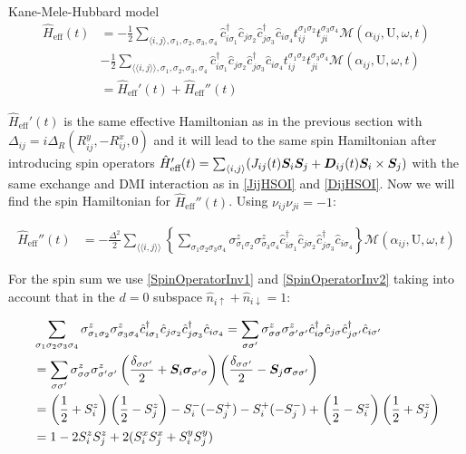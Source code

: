 \begin{section}{Kane-Mele-Hubbard model}
\begin{align*}
\hat{H}_{\text{eff}}(t) &= - \frac{1}{2} \sum_{\langle i,j \rangle, \sigma_1, \sigma_2, \sigma_3, \sigma_4}\hat{c}_{i \sigma_1}^\dagger \hat{c}_{j \sigma_2} \hat{c}_{j \sigma_3}^\dagger \hat{c}_{i \sigma_4} t_{ij}^{\sigma_1 \sigma_2} t_{ji}^{\sigma_3 \sigma_4} \mathcal{M}(\alpha_{ij}, \text{U}, \omega, t) \\
& - \frac{1}{2} \sum_{\langle \langle i,j \rangle \rangle, \sigma_1, \sigma_2, \sigma_3, \sigma_4}\hat{c}_{i \sigma_1}^\dagger \hat{c}_{j \sigma_2} \hat{c}_{j \sigma_3}^\dagger \hat{c}_{i \sigma_4} t_{ij}^{\sigma_1 \sigma_2} t_{ji}^{\sigma_3 \sigma_4} \mathcal{M}(\alpha_{ij}, \text{U}, \omega, t) \\
&= \hat{H}_{\text{eff}}'(t) + \hat{H}_{\text{eff}}''(t)
\end{align*}

$\hat{H}_{\text{eff}}'(t)$ is the same effective Hamiltonian as in the previous section with $\Delta_{ij} = i\Delta_R (R_{ij}^y, - R_{ij}^x, 0)$ and it will lead to the same spin Hamiltonian after introducing spin operators $\hat{H}_{\text{eff}}'(t) = \sum_{\langle i,j \rangle} (J_{ij}(t) \boldsymbol{S}_i\boldsymbol{S}_j + \boldsymbol{D}_{ij}(t)\boldsymbol{S}_i \times \boldsymbol{S}_j)$ with the same exchange and DMI interaction as in \ref{JijHSOI} and \ref{DijHSOI}. Now we will find the spin Hamiltonian for $\hat{H}_{\text{eff}}''(t)$. Using $\nu_{ij}\nu_{ji} = -1$:

\begin{align*}
\hat{H}_{\text{eff}}''(t) &= -\frac{\Delta^2}{2} \sum_{\langle \langle i,j \rangle \rangle} \left\{ \sum_{\sigma_1 \sigma_2 \sigma_3 \sigma_4} \sigma_{\sigma_1 \sigma_2}^z\sigma_{\sigma_3 \sigma_4}^z \hat{c}_{i\sigma_1}^\dagger\hat{c}_{j\sigma_2}\hat{c}_{j\sigma_3}^\dagger\hat{c}_{i\sigma_4} \right\} \mathcal{M}(\alpha_{ij}, \text{U}, \omega, t)
\end{align*}

For the spin sum we use \ref{SpinOperatorInv1} and \ref{SpinOperatorInv2} taking into account that in the $d=0$ subspace $\hat{n}_{i\uparrow}+\hat{n}_{i\downarrow} = 1$:

\begin{align*}
&\sum_{\sigma_1 \sigma_2 \sigma_3 \sigma_4} \sigma_{\sigma_1 \sigma_2}^z\sigma_{\sigma_3 \sigma_4}^z \hat{c}_{i\sigma_1}^\dagger\hat{c}_{j\sigma_2}\hat{c}_{j\sigma_3}^\dagger\hat{c}_{i\sigma_4} = \sum_{\sigma \sigma'} \sigma_{\sigma \sigma}^z\sigma_{\sigma' \sigma'}^z \hat{c}_{i\sigma}^\dagger\hat{c}_{j\sigma}\hat{c}_{j\sigma'}^\dagger\hat{c}_{i\sigma'} \\
&= \sum_{\sigma \sigma'} \sigma_{\sigma \sigma}^z\sigma_{\sigma' \sigma'}^z \left( \frac{\delta_{\sigma\sigma'}}{2} + \boldsymbol{S}_i\boldsymbol{\sigma}_{\sigma'\sigma}\right)\left( \frac{\delta_{\sigma\sigma'}}{2} - \boldsymbol{S}_j\boldsymbol{\sigma}_{\sigma\sigma'}\right) \\
&= \left( \frac{1}{2}+S_i^z \right) \left( \frac{1}{2}-S_j^z \right) - S_i^-(-S_j^+)-S_i^+(-S_j^-) + \left( \frac{1}{2}-S_i^z \right) \left( \frac{1}{2}+S_j^z \right) \\
&= 1-2S_i^zS_j^z+2(S_i^xS_j^x+S_i^yS_j^y)
\end{align*}


\end{section}
